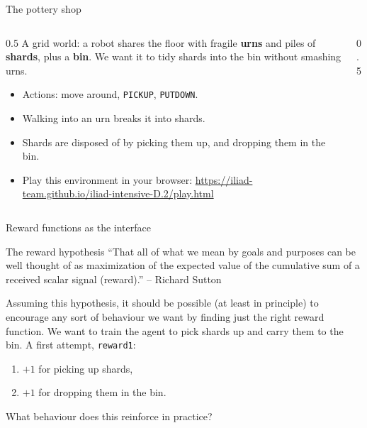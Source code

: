 \begin{frame}{The pottery shop}
\begin{columns}
\begin{column}{0.5\textwidth}
A grid world: a robot shares the floor with fragile \textbf{urns} and piles of \textbf{shards}, 
plus a \textbf{bin}. We want it to tidy shards into the bin without smashing urns.
\begin{itemize}
  \item Actions: move around, \texttt{PICKUP}, \texttt{PUTDOWN}.
  \item Walking into an urn breaks it into shards.
  \item Shards are disposed of by picking them up, and dropping them in the bin.
  \item Play this environment in your browser: \href{https://iliad-team.github.io/iliad-intensive-D.2/play.html}{https://iliad-team.github.io/iliad-intensive-D.2/play.html}
\end{itemize}
\end{column}
\begin{column}{0.5\textwidth}
\centering
{}\\[1ex]
\end{column}
\end{columns}
\end{frame}

\begin{frame}{Reward functions as the interface}

\begin{block}{The reward hypothesis}
  ``That all of what we mean by goals and purposes can be well thought of as maximization of the expected value of the cumulative sum of a received scalar signal (reward).'' -- Richard Sutton
\end{block}
Assuming this hypothesis, it should be possible (at least in principle) to encourage 
any sort of behaviour we want by finding just the right reward function.
\pause
\vfill
We want to train the agent to pick shards up and carry them to the bin.
A first attempt, \texttt{reward1}: 
\begin{enumerate}
\item $+1$ for picking up shards, 
\item $+1$ for dropping them in the bin.
\end{enumerate}
What behaviour does this reinforce in practice?
\end{frame}

